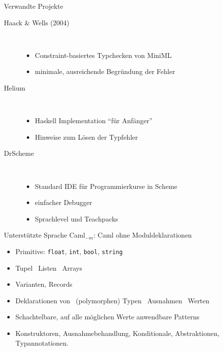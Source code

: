 \documentclass
[handout]
{beamer}
\begin{document}
\begin{frame}{Verwandte Projekte}
  \begin{description}
    \item[Haack \& Wells (2004)]\ \\
      \begin{itemize}
        \item Constraint-basiertes Typchecken von MiniML
        \item minimale, ausreichende Begründung der Fehler
      \end{itemize}
    \item[Helium]\ \\
      \begin{itemize}
        \item Haskell Implementation ``für Anfänger''
        \item Hinweise zum Lösen der Typfehler
      \end{itemize}
    \item[DrScheme]\ \\
      \begin{itemize}
        \item Standard IDE für Programmierkurse in Scheme
        \item einfacher Debugger
        \item Sprachlevel und Teachpacks
      \end{itemize}
  \end{description}
\end{frame}

\begin{frame}{Unterstützte Sprache}
  Caml$_{-m}$: Caml ohne Moduldeklarationen
  \begin{itemize}
    \item Primitive: \texttt{float}, \texttt{int}, \texttt{bool}, \texttt{string}
    \item Tupel \interitem\ Listen \interitem\ Arrays
    \item Varianten, Records
    \item Deklarationen von \interitem\ (polymorphen) Typen
      \interitem\ Ausnahmen \interitem\ Werten
    \item Schachtelbare, auf alle möglichen Werte anwendbare Patterns
    \item Konstruktoren, Ausnahmebehandlung, Konditionale, Abstraktionen, Typannotationen.
  \end{itemize}
\end{frame}
\end{document}
